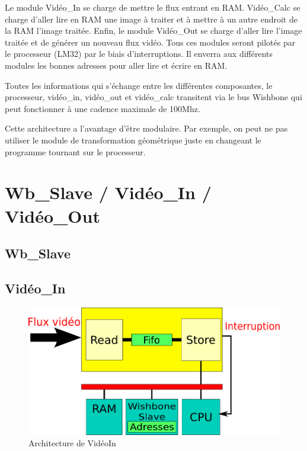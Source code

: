 \documentclass[a4paper,12pt]{report}
\begin{document}
{{{                                 Le module Vidéo\_In se charge de mettre le flux entrant en RAM. Vidéo\_Calc se charge d'aller lire en RAM une image à traiter et à mettre à un autre endroit de la RAM l'image traitée. Enfin, le module Vidéo\_Out se charge d'aller lire l'image traitée et de générer un nouveau flux vidéo. Tous ces modules seront pilotés par le processeur (LM32) par le biais d'interruptions. Il enverra aux différents modules les bonnes adresses pour aller lire et écrire en RAM.

                                 Toutes les informations qui s'échange entre les différentes composantes, le processeur, vidéo\_in, vidéo\_out et vidéo\_calc transitent via le bus Wishbone qui peut fonctionner à une cadence maximale de 100Mhz.

                                 Cette architecture a l'avantage d'être modulaire. Par exemple, on peut ne pas utiliser le module de transformation géométrique juste en changeant le programme tournant sur le processeur.
                               }



                               \chapter{Wb\_Slave / Vidéo\_In / Vidéo\_Out}
                               \section{Wb\_Slave}


                               \section{Vidéo\_In}

                               \begin{figure}[!h]
	                         \centering
	                         \includegraphics[scale = 0.5]{video_in.png}
	                         \caption{Architecture de VidéoIn}
                               \end{figure}

}}
\end{document}
